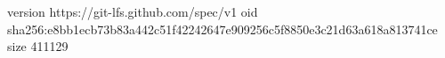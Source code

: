 version https://git-lfs.github.com/spec/v1
oid sha256:e8bb1ecb73b83a442c51f42242647e909256c5f8850e3c21d63a618a813741ce
size 411129
